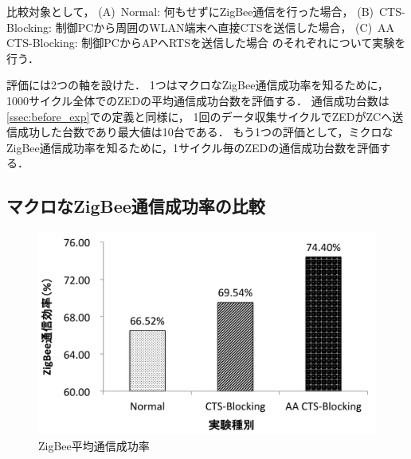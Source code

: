 \documentclass[technicalreport]{ieicej}
\begin{document}
比較対象として，
(A)~Normal: 何もせずにZigBee通信を行った場合，
(B)~CTS-Blocking: 制御PCから周囲のWLAN端末へ直接CTSを送信した場合，
(C)~AA CTS-Blocking: 制御PCからAPへRTSを送信した場合
のそれぞれについて実験を行う．

評価には2つの軸を設けた．
1つはマクロなZigBee通信成功率を知るために，1000サイクル全体でのZEDの平均通信成功台数を評価する．
通信成功台数は\ref{ssec:before_exp}での定義と同様に，
1回のデータ収集サイクルでZEDがZCへ送信成功した台数であり最大値は10台である．
もう1つの評価として，ミクロなZigBee通信成功率を知るために，1サイクル毎のZEDの通信成功台数を評価する．

\subsection{マクロなZigBee通信成功率の比較}
\label{sec:exp_result_all}

\begin{figure}[bt]
 \centering
 \includegraphics[width=\columnwidth]{figure/eff_all_zigbee.pdf}
 \caption{ZigBee平均通信成功率}
 \label{fig:eff_all_zigbee}
\end{figure}
\end{document}
